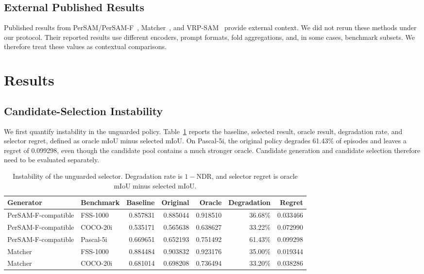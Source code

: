 \documentclass{CVM}
\begin{document}
\subsection{External Published Results}

Published results from PerSAM/PerSAM-F~\cite{2}, Matcher~\cite{8}, and VRP-SAM~\cite{9} provide external context. We did not rerun these methods under our protocol. Their reported results use different encoders, prompt formats, fold aggregations, and, in some cases, benchmark subsets. We therefore treat these values as contextual comparisons.

\section{Results}

\subsection{Candidate-Selection Instability}

We first quantify instability in the unguarded policy. Table~\ref{tab:instability} reports the baseline, selected result, oracle result, degradation rate, and selector regret, defined as oracle mIoU minus selected mIoU. On Pascal-5i, the original policy degrades 61.43\% of episodes and leaves a regret of 0.099298, even though the candidate pool contains a much stronger oracle. Candidate generation and candidate selection therefore need to be evaluated separately.

\begin{table}[h!t]
\center
\caption{Instability of the unguarded selector. Degradation rate is $1-\mathrm{NDR}$, and selector regret is oracle mIoU minus selected mIoU.}
\begin{tabular}{llrrrrr}
\toprule
Generator & Benchmark & Baseline & Original & Oracle & Degradation & Regret \\
\midrule
PerSAM-F-compatible & FSS-1000 & 0.857831 & 0.885044 & 0.918510 & 36.68\% & 0.033466 \\
PerSAM-F-compatible & COCO-20i & 0.535171 & 0.565638 & 0.638627 & 33.22\% & 0.072990 \\
PerSAM-F-compatible & Pascal-5i & 0.669651 & 0.652193 & 0.751492 & 61.43\% & 0.099298 \\
Matcher & FSS-1000 & 0.884484 & 0.903832 & 0.923176 & 35.00\% & 0.019344 \\
Matcher & COCO-20i & 0.681014 & 0.698208 & 0.736494 & 33.20\% & 0.038286 \\
\bottomrule
\end{tabular}
\label{tab:instability}
\end{table}
\end{document}
